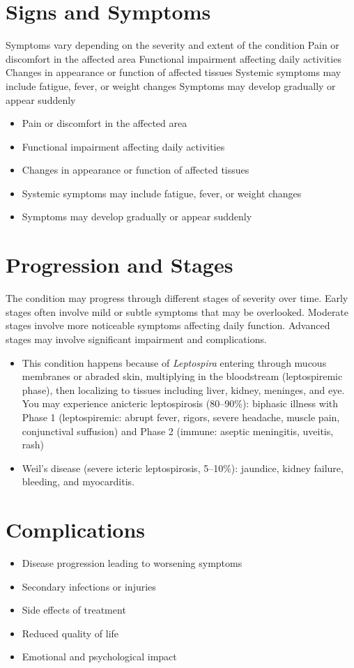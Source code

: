 \section{Signs and Symptoms}
Symptoms vary depending on the severity and extent of the condition Pain or discomfort in the affected area Functional impairment affecting daily activities Changes in appearance or function of affected tissues Systemic symptoms may include fatigue, fever, or weight changes Symptoms may develop gradually or appear suddenly

\begin{itemize}[noitemsep]
  \item Pain or discomfort in the affected area
  \item Functional impairment affecting daily activities
  \item Changes in appearance or function of affected tissues
  \item Systemic symptoms may include fatigue, fever, or weight changes
  \item Symptoms may develop gradually or appear suddenly
\end{itemize}
\section{Progression and Stages}
The condition may progress through different stages of severity over time. Early stages often involve mild or subtle symptoms that may be overlooked. Moderate stages involve more noticeable symptoms affecting daily function. Advanced stages may involve significant impairment and complications.

\begin{itemize}[noitemsep]
  \item This condition happens because of \textit{Leptospira} entering through mucous membranes or abraded skin, multiplying in the bloodstream (leptospiremic phase), then localizing to tissues including liver, kidney, meninges, and eye. You may experience anicteric leptospirosis (80--90\%): biphasic illness with Phase 1 (leptospiremic: abrupt fever, rigors, severe headache, muscle pain, conjunctival suffusion) and Phase 2 (immune: aseptic meningitis, uveitis, rash)
  \item Weil's disease (severe icteric leptospirosis, 5--10\%): jaundice, kidney failure, bleeding, and myocarditis.
\end{itemize}
\section{Complications}
\begin{itemize}[noitemsep]
  \item Disease progression leading to worsening symptoms
  \item Secondary infections or injuries
  \item Side effects of treatment
  \item Reduced quality of life
  \item Emotional and psychological impact
\end{itemize}
